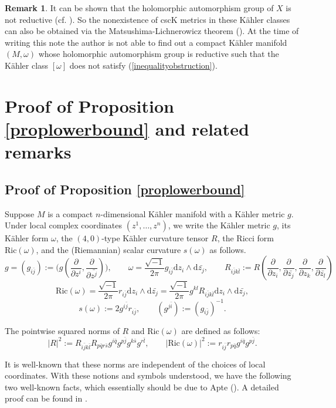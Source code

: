 \documentclass[11pt]{amsart}
\theoremstyle{definition}
\newtheorem{remark}[theorem]{Remark}
\theoremstyle{remark}
\numberwithin{equation}{section}
\begin{document}
\begin{remark}
It can be shown that the holomorphic automorphism group of $X$ is
not reductive (cf. \cite[p. 138]{De}). So the nonexistence of cscK
metrics in these K\"{a}hler classes can also be obtained via the
Matsushima-Lichnerowicz theorem (\cite{ML}). At the time of writing
this note the author is not able to find out a compact K\"{a}hler
manifold $(M,\omega)$ whose holomorphic automorphism group is
reductive such that the K\"{a}hler class $[\omega]$ does not satisfy
(\ref{inequalityobstruction}).
\end{remark}

\section{Proof of Proposition \ref{proplowerbound} and related
remarks}
\subsection{Proof of Proposition
\ref{proplowerbound}}\label{section3.1}

Suppose $M$ is a compact $n$-dimensional K\"{a}hler manifold
 with a K\"{a}hler metric $g$. Under local complex coordinates
 $(z^1,\ldots,z^n)$, we write the K\"{a}hler metric $g$,
 its K\"{a}hler form $\omega$, the $(4,0)$-type K\"{a}hler curvature tensor
 $R$, the Ricci form $\text{Ric}(\omega)$, and the (Riemannian) scalar curvature
 $s(\omega)$ as follows.
$$g=(g_{i\bar{j}}):=
\big(g(\frac{\partial}{\partial z^i},\frac{\partial}{\partial
\bar{z^j}})\big),\qquad\omega=\frac{\sqrt{-1}}{2\pi}g_{i\bar{j}}\text{d}z_i\wedge\text{d}\bar{z_j},
\qquad R_{i\bar{j}k\bar{l}}:=R(\frac{\partial}{\partial
z_i},\frac{\partial}{\partial \bar{z_j}}, \frac{\partial}{\partial
z_k},\frac{\partial}{\partial \bar{z_l}})$$
$$\text{Ric}(\omega)=\frac{\sqrt{-1}}{2\pi}
r_{i\bar{j}}\text{d}z_i\wedge\text{d}\bar{z_j}=\frac{\sqrt{-1}}{2\pi}
g^{kl}R_{i\bar{j}k\bar{l}}\text{d}z_i\wedge\text{d}\bar{z_j},
$$
$$s(\omega):=2g^{i\bar{j}}r_{i\bar{j}},\qquad
(g^{j\bar{i}}):=(g_{i\bar{j}})^{-1}.$$

The pointwise squared norms of $R$ and $\text{Ric}(\omega)$ are
defined as follows:
$$|R|^2:=R_{i\bar{j}k\bar{l}}R_{p\bar{q}r\bar{s}}
g^{i\bar{q}}g^{p\bar{j}}g^{k\bar{s}}g^{r\bar{l}},
\qquad|\text{Ric}(\omega)|^2:=r_{i\bar{j}}r_{p\bar{q}}g^{i\bar{q}}g^{p\bar{j}}.$$

It is well-known that these norms are independent of the choices of
local coordinates. With these notions and symbols understood, we
have the following two well-known facts, which essentially should be
due to Apte (\cite{Ap}). A detailed proof can be found in \cite[p.
225-226]{Zh}.
\end{document}
